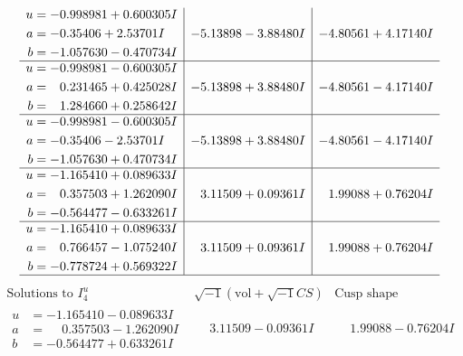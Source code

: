 \documentclass[1p]{elsarticle_modified}
\theoremstyle{definition}
\newcommand{\I}{\sqrt{-1}}
\begin{document}
$$\begin{array}{c|c|c}
\begin{aligned}
u &= -0.998981 + 0.600305 I \\
a &= -0.35406 + 2.53701 I \\
b &= -1.057630 - 0.470734 I\end{aligned}
 & -5.13898 - 3.88480 I & -4.80561 + 4.17140 I \\ \hline\begin{aligned}
u &= -0.998981 - 0.600305 I \\
a &= \phantom{-}0.231465 + 0.425028 I \\
b &= \phantom{-}1.284660 + 0.258642 I\end{aligned}
 & -5.13898 + 3.88480 I & -4.80561 - 4.17140 I \\ \hline\begin{aligned}
u &= -0.998981 - 0.600305 I \\
a &= -0.35406 - 2.53701 I \\
b &= -1.057630 + 0.470734 I\end{aligned}
 & -5.13898 + 3.88480 I & -4.80561 - 4.17140 I \\ \hline\begin{aligned}
u &= -1.165410 + 0.089633 I \\
a &= \phantom{-}0.357503 + 1.262090 I \\
b &= -0.564477 - 0.633261 I\end{aligned}
 & \phantom{-}3.11509 + 0.09361 I & \phantom{-}1.99088 + 0.76204 I \\ \hline\begin{aligned}
u &= -1.165410 + 0.089633 I \\
a &= \phantom{-}0.766457 - 1.075240 I \\
b &= -0.778724 + 0.569322 I\end{aligned}
 & \phantom{-}3.11509 + 0.09361 I & \phantom{-}1.99088 + 0.76204 I\\
 \hline 
 \end{array}$$\newpage$$\begin{array}{c|c|c}  
\text{Solutions to }I^u_{4}& \I (\text{vol} + \sqrt{-1}CS) & \text{Cusp shape}\\
 \hline 
\begin{aligned}
u &= -1.165410 - 0.089633 I \\
a &= \phantom{-}0.357503 - 1.262090 I \\
b &= -0.564477 + 0.633261 I\end{aligned}
 & \phantom{-}3.11509 - 0.09361 I & \phantom{-}1.99088 - 0.76204 I \\ \hline\begin{aligned}

\end{aligned}
\end{array}$$
\end{document}
